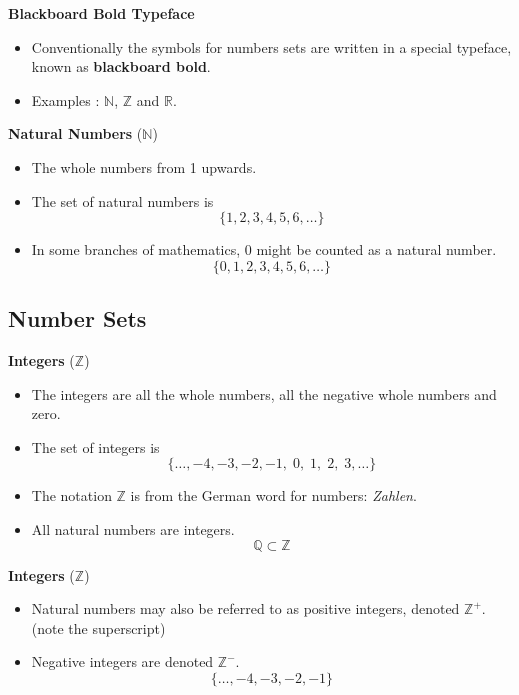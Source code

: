 \documentclass[11pt,a4paper,titlepage,oneside,openany]{article}
\numberwithin{equation}{section}
\numberwithin{algorithm}{section}
\numberwithin{figure}{section}
\numberwithin{table}{section}
\begin{document}
{%
\textbf{Blackboard Bold Typeface}

\begin{itemize}
\item Conventionally the symbols for numbers sets are written in a special typeface, known as \textbf{blackboard bold}.
\item Examples : $\mathbb{N}$, $\mathbb{Z}$ and $\mathbb{R}$.

\end{itemize}


\textbf{Natural Numbers} ($\mathbb{N}$)
\begin{itemize}
\item The whole numbers from 1 upwards. 

\item The set of natural numbers is 
\[\{1,2,3,4,5,6,\ldots\} \]
\item In some branches of mathematics, $0$ might be counted as a natural number.
\[\{0,1,2,3,4,5,6,\ldots\} \]
\end{itemize}



\subsection{Number Sets}


\textbf{Integers} ($\mathbb{Z}$)
\begin{itemize}
\item The integers are all the whole numbers, all the negative whole numbers and zero.

\item The set of integers is 
\[\{\ldots,-4,-3,-2,-1,\;0,\;1,\;2,\;3,\ldots\} \]
\item The notation $\mathbb{Z}$ is from the German word for numbers: \textit{Zahlen}. 
\item All natural numbers are integers.
\[ \mathbb{Q}  \subset \mathbb{Z}\]
\end{itemize}




\textbf{Integers} ($\mathbb{Z}$)
\begin{itemize}
\item Natural numbers may also be referred to as positive integers, denoted $\mathbb{Z}^{+}$. \\(note the superscript)
\item Negative integers are denoted $\mathbb{Z}^{-}$.
\[\{\ldots,-4,-3,-2,-1\}\]
\end{itemize}

}
\end{document}

